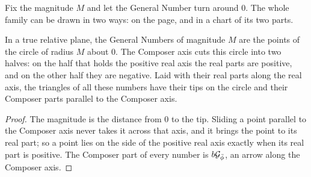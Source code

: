 Fix the magnitude $M$ and let the General Number turn around $0$. The whole family can be drawn in two ways: on the page, and in a chart of its two parts.

\begin{proposition}\label{prop:circle-magnitude}
In a true relative plane, the General Numbers of magnitude $M$ are the points of the circle of radius $M$ about $0$. The Composer axis cuts this circle into two halves: on the half that holds the positive real axis the real parts are positive, and on the other half they are negative. Laid with their real parts along the real axis, the triangles of all these numbers have their tips on the circle and their Composer parts parallel to the Composer axis.
\end{proposition}

\begin{proof}
The magnitude is the distance from $0$ to the tip. Sliding a point parallel to the Composer axis never takes it across that axis, and it brings the point to its real part; so a point lies on the side of the positive real axis exactly when its real part is positive. The Composer part of every number is $b\mathcal{G}_{\bar{\phi}}$, an arrow along the Composer axis.
\end{proof}

